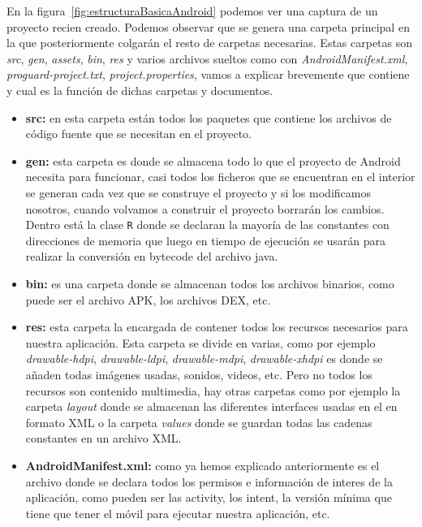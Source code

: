 \begin{itemize}
En la figura~\ref{fig:estructuraBasicaAndroid} podemos ver una captura de un proyecto recien creado. Podemos observar que se genera una carpeta principal en la que posteriormente colgarán el resto de carpetas necesarias. Estas carpetas son \textit{src}, \textit{gen}, \textit{assets}, \textit{bin}, \textit{res} y varios archivos sueltos como con \textit{AndroidManifest.xml}, \textit{proguard-project.txt}, \textit{project.properties}, vamos a explicar brevemente que contiene y cual es la función de dichas carpetas y documentos.

\begin{itemize}

\item \textbf{src:} en esta carpeta están todos los paquetes que contiene los archivos de código fuente que se necesitan en el proyecto.

\item \textbf{gen:} esta carpeta es donde se almacena todo lo que el proyecto de Android necesita para funcionar, casi todos los ficheros que se encuentran en el interior se generan cada vez que se construye el proyecto y si los modificamos nosotros, cuando volvamos a construir el proyecto borrarán los cambios. Dentro está la clase \lstinline{R} donde se declaran la mayoría de las constantes con direcciones de memoria que luego en tiempo de ejecución se usarán para realizar la conversión en bytecode del archivo java.

\item \textbf{bin:} es una carpeta donde se almacenan todos los archivos binarios, como puede ser el archivo APK, los archivos DEX, etc.

\item \textbf{res:} esta carpeta la encargada de contener todos los recursos necesarios para nuestra aplicación. Esta carpeta se divide en varias, como por ejemplo \textit{drawable-hdpi}, \textit{drawable-ldpi}, \textit{drawable-mdpi}, \textit{drawable-xhdpi} es donde se añaden todas imágenes usadas, sonidos, videos, etc. Pero no todos los recursos son contenido multimedia, hay otras carpetas como por ejemplo la carpeta \textit{layout} donde se almacenan las diferentes interfaces usadas en el en formato XML o la carpeta \textit{values} donde se guardan todas las cadenas constantes en un archivo XML.

\item \textbf{AndroidManifest.xml:} como ya hemos explicado anteriormente es el archivo donde se declara todos los permisos e información de interes de la aplicación, como pueden ser las activity, los intent, la versión mínima que tiene que tener el móvil para ejecutar nuestra aplicación, etc.  


\end{itemize}
\end{itemize}
